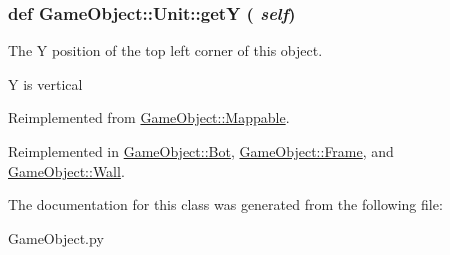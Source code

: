 \hypertarget{classGameObject_1_1Unit_a4d0c47deb0ddb19b9e2b195d8ca2f2ad}{
\subsubsection[{getY}]{\setlength{\rightskip}{0pt plus 5cm}def GameObject::Unit::getY ( {\em self})}}
\label{classGameObject_1_1Unit_a4d0c47deb0ddb19b9e2b195d8ca2f2ad}


The Y position of the top left corner of this object. 

Y is vertical 

Reimplemented from \hyperlink{classGameObject_1_1Mappable_af7b558a1be2dc80d1aa78f306e226c10}{GameObject::Mappable}.



Reimplemented in \hyperlink{classGameObject_1_1Bot_a5e193704cae24529a6e6f00fd9a1447f}{GameObject::Bot}, \hyperlink{classGameObject_1_1Frame_abf564d6f986b8e9d2a83838691c591f9}{GameObject::Frame}, and \hyperlink{classGameObject_1_1Wall_ac87b620714dfacc5ac12ca6078a91460}{GameObject::Wall}.



The documentation for this class was generated from the following file:\begin{DoxyCompactItemize}
\item 
GameObject.py\end{DoxyCompactItemize}
